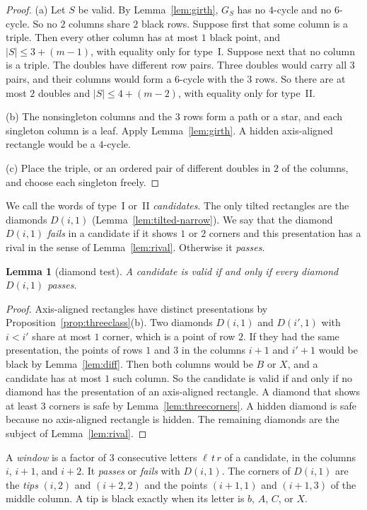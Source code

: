 \documentclass[12pt]{article}
\theoremstyle{plain}
\newtheorem{lemma}[theorem]{Lemma}
\theoremstyle{definition}
\theoremstyle{remark}
\begin{document}
\begin{proof}
(a) Let $S$ be valid. By Lemma~\ref{lem:girth}, $G_S$ has no $4$-cycle and no
$6$-cycle. So no $2$ columns share $2$ black rows. Suppose first that some
column is a triple. Then every other column has at most $1$ black point, and
$|S|\le3+(m-1)$, with equality only for type~I. Suppose next that no column is a
triple. The doubles have different row pairs. Three doubles would carry
all $3$ pairs, and their columns would form a $6$-cycle with the $3$ rows. So
there are at most $2$ doubles and $|S|\le4+(m-2)$, with equality only for
type~II.

(b) The nonsingleton columns and the $3$ rows form a path or a star, and each
singleton column is a leaf. Apply Lemma~\ref{lem:girth}. A hidden axis-aligned
rectangle would be a $4$-cycle.

(c) Place the triple, or an ordered pair of different doubles in $2$ of the
columns, and choose each singleton freely.
\end{proof}

We call the words of type~I or~II \emph{candidates}. The only tilted
rectangles are the diamonds $D(i,1)$ (Lemma~\ref{lem:tilted-narrow}). We say
that the diamond $D(i,1)$ \emph{fails} in a candidate if it shows $1$ or $2$
corners and this presentation has a rival in the sense of
Lemma~\ref{lem:rival}. Otherwise it \emph{passes}.

\begin{lemma}[diamond test]\label{lem:diamond}
A candidate is valid if and only if every diamond $D(i,1)$ passes.
\end{lemma}

\begin{proof}
Axis-aligned rectangles have distinct presentations by
Proposition~\ref{prop:threeclass}(b). Two diamonds $D(i,1)$ and $D(i',1)$ with
$i<i'$ share at most $1$ corner, which is a point of row $2$. If they had the
same presentation, the points of rows $1$ and $3$ in the columns $i+1$ and
$i'+1$ would be black by Lemma~\ref{lem:diff}. Then both columns would be $B$
or $X$, and a candidate has at most $1$ such column. So the candidate is valid
if and only if no diamond has the presentation of an axis-aligned rectangle.
A diamond that shows at least $3$ corners is safe by
Lemma~\ref{lem:threecorners}. A hidden diamond is safe because no axis-aligned
rectangle is hidden. The remaining diamonds are the subject of
Lemma~\ref{lem:rival}.
\end{proof}

A \emph{window} is a factor of $3$ consecutive letters $\ell\,t\,r$ of a
candidate, in the columns $i$, $i+1$, and $i+2$. It \emph{passes} or
\emph{fails} with $D(i,1)$. The corners of $D(i,1)$ are the \emph{tips} $(i,2)$
and $(i+2,2)$ and the points $(i+1,1)$ and $(i+1,3)$ of the middle column. A
tip is black exactly when its letter is $b$, $A$, $C$, or $X$.
\end{document}
